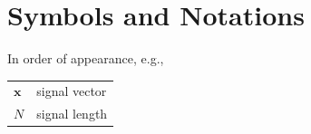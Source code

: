 \chapter{Symbols and Notations}

In order of appearance, e.g.,\\

\begin{tabular}{ll}
  $\mathbf{x}$    & signal vector	\\
  $N$             & signal length
\end{tabular}
